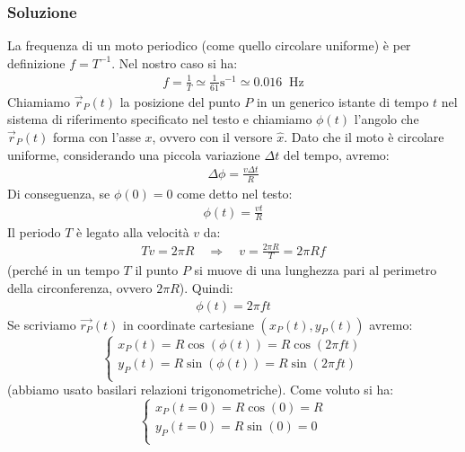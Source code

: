 \documentclass[12pt,a4paper]{book}
\begin{document}
\subsubsection*{Soluzione}
La frequenza di un moto periodico (come quello circolare uniforme) è per definizione $f=T^{-1}$. Nel nostro caso si ha:
%
\begin{gather*}
f=\frac{1}{T} \simeq \frac{1}{61} \text{s}^{-1} \simeq 0.016\; \;  \text{Hz}
\end{gather*} 
%
Chiamiamo $\vec{r}_P(t)$ la posizione del punto $P$ in un generico istante di tempo $t$ nel sistema di riferimento specificato nel testo e chiamiamo $\phi(t)$ l'angolo che $\vec{r}_P(t)$ forma con l'asse $x$, ovvero con il versore $\hat{x}$.  Dato che il moto è circolare uniforme, considerando 
una piccola variazione $\Delta t$ del tempo, avremo: 
%
\begin{gather*}
\Delta \phi = \frac{v \Delta t}{R}
\end{gather*} 
%
Di conseguenza, se $\phi(0)=0$ come detto nel testo:
%
\begin{gather*}
\phi(t) = \frac{v t}{R}
\end{gather*} 
%
Il periodo $T$ è legato alla velocità $v$ da:
%
\begin{gather*}
Tv=2\pi R \quad \Rightarrow \quad v=\frac{2 \pi R}{T}=2 \pi R f
\end{gather*} 
%
(perché in un tempo $T$ il punto $P$ si muove di una lunghezza pari al perimetro della circonferenza, ovvero $2\pi R$). Quindi: 
%
\begin{gather*}
\phi(t) = 2 \pi f t
\end{gather*} 
%
Se scriviamo $\vec{r_P}(t)$ in coordinate cartesiane 
$(x_P(t), y_P(t))$ avremo:
%
\begin{equation*}
 \left\{\begin{array}{lr}
  x_P(t)= R \cos(\phi(t))=R \cos(2 \pi f t) \\
  y_P(t)= R \sin(\phi(t))=R \sin(2 \pi f t)\\
        \end{array}\right.
\end{equation*}
%
(abbiamo usato basilari relazioni trigonometriche). Come voluto si ha:
%
\begin{equation*}
 \left\{\begin{array}{lr}
  x_P(t=0)=R \cos(0)= R \\
  y_P(t=0)= R \sin(0)=0\\
        \end{array}\right.
\end{equation*}
\end{document}
